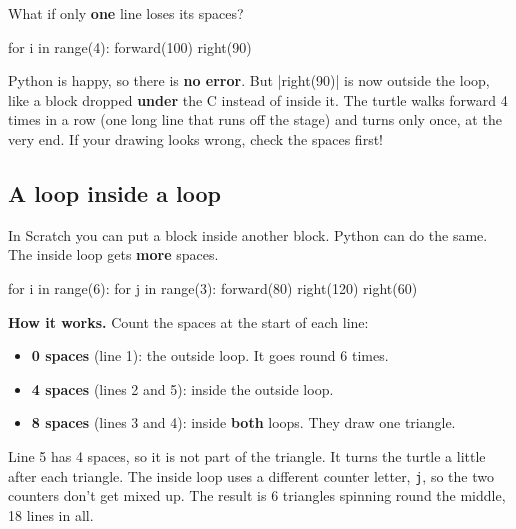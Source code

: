\begin{watchout}
What if only \textbf{one} line loses its spaces?
\begin{codenonum}
for i in range(4):
    forward(100)
right(90)
\end{codenonum}
Python is happy, so there is \textbf{no error}. But \py|right(90)| is now outside the loop, like a block dropped \textbf{under} the C instead of inside it. The turtle walks forward 4 times in a row (one long line that runs off the stage) and turns only once, at the very end. If your drawing looks wrong, check the spaces first!
\end{watchout}

\subsection*{A loop inside a loop}

In Scratch you can put a  block inside another  block. Python can do the same. The inside loop gets \textbf{more} spaces.

\begin{tcbraster}[raster columns=2, raster equal height=rows, raster column skip=12pt, raster valign=center]
\begin{tcolorbox}[colback=white, colframe=white, boxrule=0pt, valign=center]
\begin{scratch}[scale=0.85]
\end{scratch}
\end{tcolorbox}
\begin{spaces}
for i in range(6):
    for j in range(3):
        forward(80)
        right(120)
    right(60)
\end{spaces}
\end{tcbraster}

\textbf{How it works.} Count the spaces at the start of each line:
\begin{itemize}
  \item \textbf{0 spaces} (line 1): the outside loop. It goes round 6 times.
  \item \textbf{4 spaces} (lines 2 and 5): inside the outside loop.
  \item \textbf{8 spaces} (lines 3 and 4): inside \textbf{both} loops. They draw one triangle.
\end{itemize}
Line 5 has 4 spaces, so it is not part of the triangle. It turns the turtle a little after each triangle. The inside loop uses a different counter letter, \texttt{j}, so the two counters don't get mixed up. The result is 6 triangles spinning round the middle, 18 lines in all.

